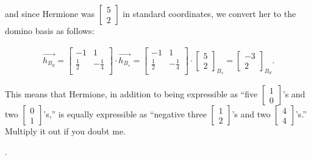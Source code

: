 and since Hermione was {\scriptsize $\begin{bmatrix} 5\\2 \end{bmatrix}$} in standard coordinates, we convert her
to the domino basis as follows:

\vspace{-.15in}
\begin{align*}
\overrightarrow{h_{B_d}} =
\begin{bmatrix}
-1 & 1 \\
\frac{1}{2} & -\frac{1}{4} \\
\end{bmatrix} \cdot
\overrightarrow{h_{B_s}} =
\begin{bmatrix}
-1 & 1 \\
\frac{1}{2} & -\frac{1}{4} \\
\end{bmatrix} \cdot
\begin{bmatrix} 5 \\ 2 \end{bmatrix}_{B_s} =
\begin{bmatrix} -3 \\ 2 \end{bmatrix}_{B_d}.
\end{align*}
\vspace{-.15in}

This means that Hermione, in addition to being expressible as ``five
{\scriptsize $\begin{bmatrix} 1 \\ 0 \end{bmatrix}$}'s and two {\scriptsize
$\begin{bmatrix} 0 \\ 1 \end{bmatrix}$}'s,'' is equally expressible as
``negative three {\scriptsize $\begin{bmatrix} 1 \\ 2 \end{bmatrix}$}'s and two
{\scriptsize $\begin{bmatrix} 4 \\ 4 \end{bmatrix}$}'s.'' Multiply it out if
you doubt me.


\bigskip
\bigskip
.
\pagebreak

